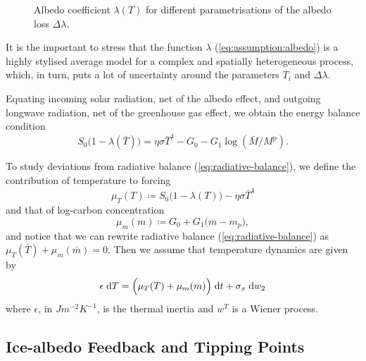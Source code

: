\documentclass[../../main.tex]{subfiles}
\begin{document}
\begin{figure}[H]
    \centering
    \caption{Albedo coefficient $\lambda(T)$ for different parametrisations of the albedo loss $\Delta \lambda$.}
    \label{fig:albedo_coefficient}
\end{figure}

It is the important to stress that the function $\lambda$ (\ref{eq:assumption:albedo}) is a highly stylised average model for a complex and spatially heterogeneous process, which, in turn, puts a lot of uncertainty around the parameters $T_i$ and $\Delta \lambda$. \iffalse In the robustness checks we explore the sensitivity of our results to these parameters. \fi

Equating incoming solar radiation, net of the albedo effect, and outgoing longwave radiation, net of the greenhouse gas effect, we obtain the energy balance condition \begin{equation} \label{eq:radiative-balance}
    S_0 \big(1 - \lambda(\bar{T})\big) = \eta \sigma \bar{T}^4 - G_0 - G_1 \log(\bar{M} / M^{\mathrm{p}}).
\end{equation}

To study deviations from radiative balance (\ref{eq:radiative-balance}), we define the contribution of temperature to forcing \begin{equation} \label{eq:forcing:temperature}
    \mu_T(T) \coloneqq S_0 \big(1 - \lambda(T)\big) - \eta \sigma \bar{T}^4
\end{equation} and that of log-carbon concentration \begin{equation} \label{eq:forcing:concentration}
    \mu_m(m) \coloneqq  G_0 + G_1  \big(m - m_p \big),
\end{equation} and notice that we can rewrite radiative balance (\ref{eq:radiative-balance}) as $\mu_T(\bar{T}) + \mu_m(\bar{m}) = 0$. Then we assume that temperature dynamics are given by \begin{equation} \label{eq:dynamics:x}
    \epsilon \; \mathrm{d}T = \Big(\mu_T(T) + \mu_m(m)\Big) \; \mathrm{d}t + \sigma_x \; \mathrm{d}w_2
\end{equation} where $\epsilon$, in $\unit{J} \unit{m}^{-2} \unit{K}^{-1}$, is the thermal inertia and $w^T$ is a Wiener process.

\subsection{Ice-albedo Feedback and Tipping Points}
\end{document}
